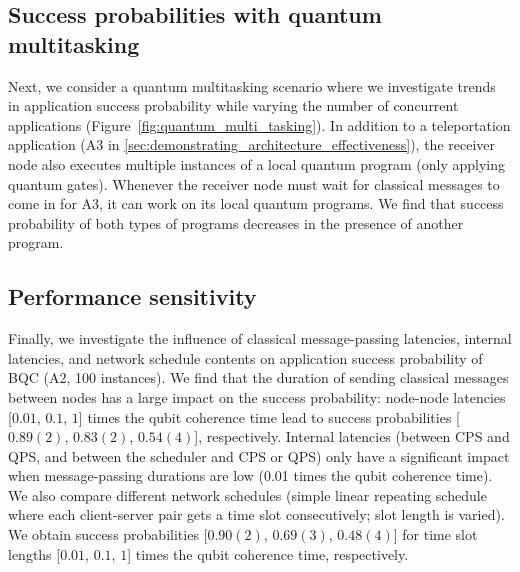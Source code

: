 \subsection{Success probabilities with quantum multitasking}
\label{sec:quantum_multitasking}
Next, we consider a quantum multitasking scenario where we investigate trends in application success probability while varying the number of concurrent applications (Figure~\ref{fig:quantum_multi_tasking}).
In addition to a teleportation application (A3 in \ref{sec:demonstrating_architecture_effectiveness}), the receiver node also executes multiple instances of a local quantum program (only applying quantum gates).
Whenever the receiver node must wait for classical messages to come in for A3, it can work on its local quantum programs.
We find that success probability of both types of programs decreases in the presence of another program.

\subsection{Performance sensitivity}
Finally, we investigate the influence of classical message-passing latencies, internal latencies, and network schedule contents on application success probability of BQC (A2, 100 instances).
We find that the duration of sending classical messages between nodes has a large impact on the success probability:
node-node latencies [$0.01$, $0.1$, $1$] times the qubit coherence time lead to success probabilities [$0.89(2)$, $0.83(2)$, $0.54(4)$], respectively.
Internal latencies (between CPS and QPS, and between the scheduler and CPS or QPS) only have a significant impact when message-passing durations are low (0.01 times the qubit coherence time).
We also compare different network schedules (simple linear repeating schedule where each client-server pair gets a time slot consecutively; slot length is varied).
We obtain success probabilities [$0.90(2)$, $0.69(3)$, $0.48(4)$] for time slot lengths [$0.01$, $0.1$, $1$] times the qubit coherence time, respectively.
